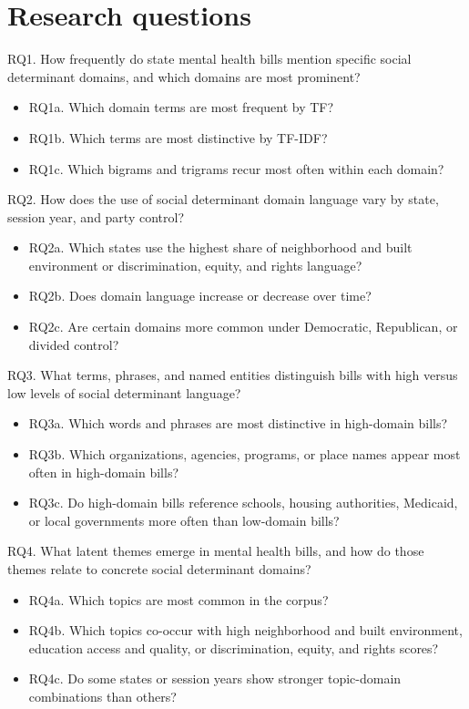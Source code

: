 \documentclass[10pt,twocolumn]{article}
\providecommand{\tightlist}{\setlength{\itemsep}{0pt}\setlength{\parskip}{0pt}}
\begin{document}
\section{Research questions}\label{research-questions}

RQ1. How frequently do state mental health bills mention specific social
determinant domains, and which domains are most prominent?

\begin{itemize}
\tightlist
\item
  RQ1a. Which domain terms are most frequent by TF?
\item
  RQ1b. Which terms are most distinctive by TF-IDF?
\item
  RQ1c. Which bigrams and trigrams recur most often within each domain?
\end{itemize}

RQ2. How does the use of social determinant domain language vary by
state, session year, and party control?

\begin{itemize}
\tightlist
\item
  RQ2a. Which states use the highest share of neighborhood and built
  environment or discrimination, equity, and rights language?
\item
  RQ2b. Does domain language increase or decrease over time?
\item
  RQ2c. Are certain domains more common under Democratic, Republican, or
  divided control?
\end{itemize}

RQ3. What terms, phrases, and named entities distinguish bills with high
versus low levels of social determinant language?

\begin{itemize}
\tightlist
\item
  RQ3a. Which words and phrases are most distinctive in high-domain
  bills?
\item
  RQ3b. Which organizations, agencies, programs, or place names appear
  most often in high-domain bills?
\item
  RQ3c. Do high-domain bills reference schools, housing authorities,
  Medicaid, or local governments more often than low-domain bills?
\end{itemize}

RQ4. What latent themes emerge in mental health bills, and how do those
themes relate to concrete social determinant domains?

\begin{itemize}
\tightlist
\item
  RQ4a. Which topics are most common in the corpus?
\item
  RQ4b. Which topics co-occur with high neighborhood and built
  environment, education access and quality, or discrimination, equity,
  and rights scores?
\item
  RQ4c. Do some states or session years show stronger topic-domain
  combinations than others?
\end{itemize}
\end{document}

